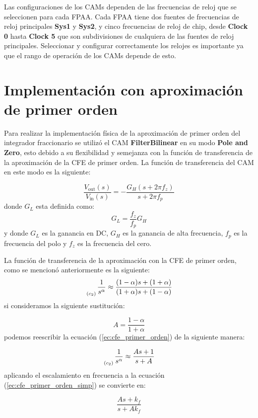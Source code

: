 	Las configuraciones de los CAMs dependen de las frecuencias de reloj que se seleccionen para cada FPAA. Cada FPAA tiene dos fuentes de frecuencias de reloj principales \textbf{Sys1} y \textbf{Sys2}, y cinco frecuencias de reloj de chip, desde \textbf{Clock 0} hasta \textbf{Clock 5} que son subdivisiones de cualquiera de las fuentes de reloj principales. Seleccionar y configurar correctamente los relojes es importante ya que el rango de operación de los CAMs depende de esto. 

	\section{Implementación con aproximación de primer orden}
	
	Para realizar la implementación física de la aproximación de primer orden del integrador fraccionario se utilizó el CAM \textbf{FilterBilinear} en su modo \textbf{Pole and Zero}, esto debido a su flexibilidad y semejanza con la función de transferencia de la aproximación de la CFE de primer orden. La función de transferencia del CAM en este modo es la siguiente:
	
	\begin{equation}
		\frac{V_{\mathrm{out}} (s)}{V_{\mathrm{in}}(s)} = -\frac{G_{H} (s + 2 \pi f_{z})}{s + 2 \pi f_{p}}
	\end{equation}
	donde $G_{L}$ esta definida como:
	\begin{equation}
		G_{L} = \frac{f_{z}}{f_{p}} G_{H}
	\end{equation}
	y donde $G_{L}$ es la ganancia en DC, $G_{H}$ es la ganancia de alta frecuencia, $f_{p}$ es la frecuencia del polo y $f_{z}$ es la frecuencia del cero.
	
	La función de transferencia de la aproximación con la CFE de primer orden, como se mencionó anteriormente es la siguiente:
	\begin{equation}
		\genfrac{}{}{0pt}{0}{}{_{(c_{2})}} \frac{1}{s^{\alpha}} \approx \frac{(1 - \alpha)s + (1 + \alpha) }{(1 + \alpha)s + (1 - \alpha)} 
		\label{ec:cfe_primer_orden}
	\end{equation}
	si consideramos la siguiente sustitución:
	
	\begin{equation}
		A = \frac{1 - \alpha}{1 + \alpha}
	\end{equation}
	podemos reescribir la ecuación (\ref{ec:cfe_primer_orden}) de la siguiente manera:
	
	\begin{equation}
		\genfrac{}{}{0pt}{0}{}{_{(c_{2})}} \frac{1}{s^{\alpha}} \approx \frac{A s + 1}{s + A}
		\label{ec:cfe_primer_orden_simp}
	\end{equation}
	aplicando el escalamiento en frecuencia a la ecuación (\ref{ec:cfe_primer_orden_simp}) se convierte en:
	
	\begin{equation}
		\frac{A s + k_{f}}{s + A k_{f}}
		\label{ec:cfe_primer_orden_simp_esc}
	\end{equation}
	